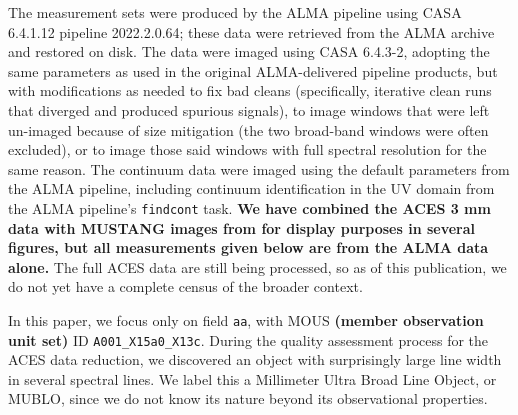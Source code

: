 \documentclass[]{aastex631}
\def\rr#1{\textbf{#1}}
\begin{document}
The measurement sets were produced by the ALMA pipeline using CASA 6.4.1.12 pipeline 2022.2.0.64; these data were retrieved from the ALMA archive and restored on disk.
The data were imaged using CASA 6.4.3-2, adopting the same parameters as used in the original ALMA-delivered pipeline products, but with modifications as needed to fix bad cleans (specifically, iterative clean runs that diverged and produced spurious signals), to image windows that were left un-imaged because of size mitigation (the two broad-band windows were often excluded), or to image those said windows with full spectral resolution for the same reason.
The continuum data were imaged using the default parameters from the ALMA pipeline, including continuum identification in the UV domain from the ALMA pipeline's \texttt{findcont} task.
\rr{We have combined the ACES 3 mm data with MUSTANG images from \citet{Ginsburg2020} for display purposes in several figures, but all measurements given below are from the ALMA data alone.}
The full ACES data are still being processed, so as of this publication, we do not yet have a complete census of the broader context.

In this paper, we focus only on field \texttt{aa}, with MOUS \rr{(member observation unit set)} ID \texttt{A001\_X15a0\_X13c}.
During the quality assessment process for the ACES data reduction, we discovered an object with surprisingly large line width in several spectral lines.
We label this a Millimeter Ultra Broad Line Object, or MUBLO, since we do not know its nature beyond its observational properties. %
\end{document}
